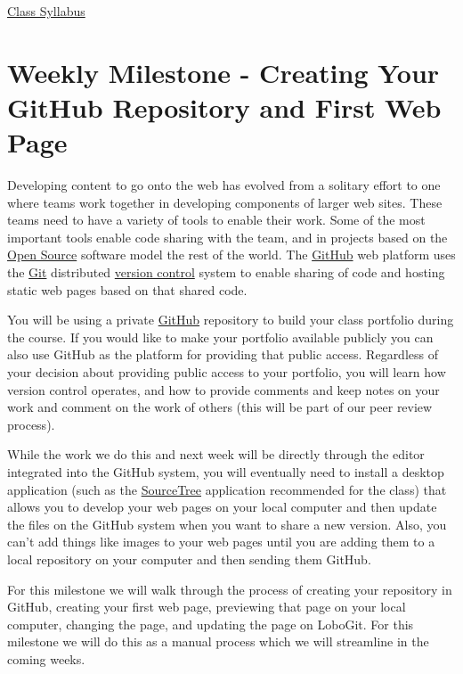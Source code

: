 \documentclass[]{book}
\begin{document}
\href{https://github.com/UNM-GEOG-485-585/class-materials/raw/master/syllabus.pdf}{Class
Syllabus}

\section{Weekly Milestone - Creating Your GitHub Repository and First
Web Page}\label{week01-milestone}

Developing content to go onto the web has evolved from a solitary effort
to one where teams work together in developing components of larger web
sites. These teams need to have a variety of tools to enable their work.
Some of the most important tools enable code sharing with the team, and
in projects based on the \href{http://opensource.org/osd-annotated}{Open
Source} software model the rest of the world. The
\href{https://github.com/}{GitHub} web platform uses the
\href{http://git-scm.com/}{Git} distributed
\href{http://en.wikipedia.org/wiki/Revision_control}{version control}
system to enable sharing of code and hosting static web pages based on
that shared code.

You will be using a private \href{http://github.com}{GitHub} repository
to build your class portfolio during the course. If you would like to
make your portfolio available publicly you can also use GitHub as the
platform for providing that public access. Regardless of your decision
about providing public access to your portfolio, you will learn how
version control operates, and how to provide comments and keep notes on
your work and comment on the work of others (this will be part of our
peer review process).

While the work we do this and next week will be directly through the
editor integrated into the GitHub system, you will eventually need to
install a desktop application (such as the
\href{https://www.sourcetreeapp.com/}{SourceTree} application
recommended for the class) that allows you to develop your web pages on
your local computer and then update the files on the GitHub system when
you want to share a new version. Also, you can't add things like images
to your web pages until you are adding them to a local repository on
your computer and then sending them GitHub.

For this milestone we will walk through the process of creating your
repository in GitHub, creating your first web page, previewing that page
on your local computer, changing the page, and updating the page on
LoboGit. For this milestone we will do this as a manual process which we
will streamline in the coming weeks.
\end{document}

